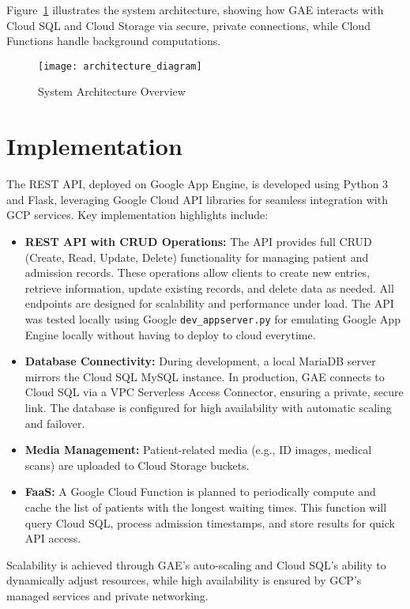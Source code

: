 \documentclass[12pt,a4paper]{article}
\begin{document}
Figure~\ref{fig:architecture} illustrates the system architecture, showing how GAE interacts with Cloud SQL and Cloud Storage via secure, private connections, while Cloud Functions handle background computations.

\begin{figure}[h]
    \centering
    \texttt{[image: architecture\_diagram]} %
    \caption{System Architecture Overview}
    \label{fig:architecture}
\end{figure}

\section{Implementation}
The REST API, deployed on Google App Engine, is developed using Python 3 and Flask, leveraging Google Cloud API libraries for seamless integration with GCP services. Key implementation highlights include:

\begin{itemize}
    \item \textbf{REST API with CRUD Operations:} The API provides full CRUD (Create, Read, Update, Delete) functionality for managing patient and admission records. These operations allow clients to create new entries, retrieve information, update existing records, and delete data as needed. All endpoints are designed for scalability and performance under load. The API was tested locally using Google \texttt{dev\_appserver.py} for emulating Google App Engine locally without having to deploy to cloud everytime.

    \item \textbf{Database Connectivity:} During development, a local MariaDB server mirrors the Cloud SQL MySQL instance. In production, GAE connects to Cloud SQL via a VPC Serverless Access Connector, ensuring a private, secure link. The database is configured for high availability with automatic scaling and failover.
    \item \textbf{Media Management:} Patient-related media (e.g., ID images, medical scans) are uploaded to Cloud Storage buckets.
    \item \textbf{FaaS:} A Google Cloud Function is planned to periodically compute and cache the list of patients with the longest waiting times. This function will query Cloud SQL, process admission timestamps, and store results for quick API access.
\end{itemize}

Scalability is achieved through GAE’s auto-scaling and Cloud SQL’s ability to dynamically adjust resources, while high availability is ensured by GCP’s managed services and private networking.
\end{document}
